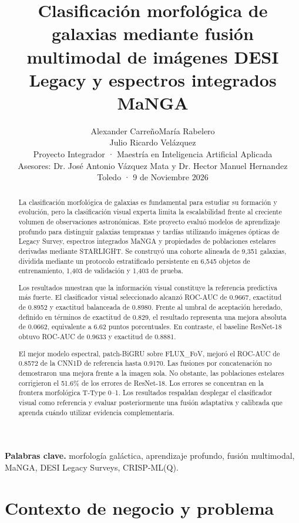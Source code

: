 \documentclass[letterpaper,11pt]{article}
\title{\textbf{Clasificación morfológica de galaxias mediante fusión multimodal de imágenes DESI Legacy y espectros integrados MaNGA}}
\author{Alexander Carreño\quad María Rabelero\\[2pt] Julio Ricardo Velázquez\\[6pt]
  \normalsize Proyecto Integrador · Maestría en Inteligencia Artificial Aplicada \\[6pt]
  \normalsize Asesores: Dr. José Antonio Vázquez Mata y Dr. Hector Manuel Hernandez Toledo · 9 de Noviembre 2026}
\date{\vspace{-2ex}}
\begin{document}
\maketitle

\begin{abstract}
La clasificación morfológica de galaxias es fundamental para estudiar su formación y evolución, pero la clasificación visual experta limita la escalabilidad frente al creciente volumen de observaciones astronómicas. Este proyecto evaluó modelos de aprendizaje profundo para distinguir galaxias tempranas y tardías utilizando imágenes ópticas de Legacy Survey, espectros integrados MaNGA y propiedades de poblaciones estelares derivadas mediante STARLIGHT. Se construyó una cohorte alineada de 9,351 galaxias, dividida mediante un protocolo estratificado persistente en 6,545 objetos de entrenamiento, 1,403 de validación y 1,403 de prueba. 

Los resultados muestran que la información visual constituye la referencia predictiva más fuerte. El clasificador visual seleccionado alcanzó ROC-AUC de 0.9667, exactitud de 0.8952 y exactitud balanceada de 0.8980. Frente al umbral de aceptación heredado, definido en términos de exactitud de 0.829, el resultado representa una mejora absoluta de 0.0662, equivalente a 6.62 puntos porcentuales. En contraste, el baseline ResNet-18 obtuvo ROC-AUC de 0.9633 y exactitud de 0.8881. 

El mejor modelo espectral, patch-BiGRU sobre FLUX\_FoV, mejoró el ROC-AUC de 0.8572 de la CNN1D de referencia hasta 0.9170. Las fusiones por concatenación no demostraron una mejora frente a la imagen sola. No obstante, las poblaciones estelares corrigieron el 51.6\% de los errores de ResNet-18. Los errores se concentran en la frontera morfológica T-Type 0--1. Los resultados respaldan desplegar el clasificador visual como referencia y evaluar posteriormente una fusión adaptativa y calibrada que aprenda cuándo utilizar evidencia complementaria.
\end{abstract}

\begin{nota}
\textbf{Palabras clave.} morfología galáctica, aprendizaje profundo, fusión multimodal, MaNGA, DESI Legacy Surveys, CRISP‑ML(Q).
\end{nota}

\section{Contexto de negocio y problema}
\end{document}
